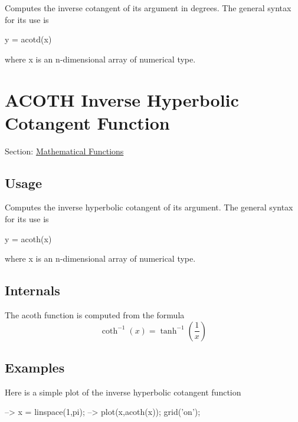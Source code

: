 Computes the inverse cotangent of its argument in degrees. The general syntax for its use is \begin{DoxyVerb}  y = acotd(x)
\end{DoxyVerb}
 where {\ttfamily x} is an {\ttfamily n}-\/dimensional array of numerical type. \hypertarget{mathfunctions_acoth}{}\section{A\-C\-O\-T\-H Inverse Hyperbolic Cotangent Function}\label{mathfunctions_acoth}
Section\-: \hyperlink{sec_mathfunctions}{Mathematical Functions} \hypertarget{vtkwidgets_vtkxyplotwidget_Usage}{}\subsection{Usage}\label{vtkwidgets_vtkxyplotwidget_Usage}
Computes the inverse hyperbolic cotangent of its argument. The general syntax for its use is \begin{DoxyVerb}  y = acoth(x)
\end{DoxyVerb}
 where {\ttfamily x} is an {\ttfamily n}-\/dimensional array of numerical type. \hypertarget{transforms_svd_Function}{}\subsection{Internals}\label{transforms_svd_Function}
The {\ttfamily acoth} function is computed from the formula \[ \coth^{-1}(x) = \tanh^{-1}\left(\frac{1}{x}\right) \] \hypertarget{variables_matrix_Examples}{}\subsection{Examples}\label{variables_matrix_Examples}
Here is a simple plot of the inverse hyperbolic cotangent function


\begin{DoxyVerbInclude}
--> x = linspace(1,pi);
--> plot(x,acoth(x)); grid('on');
\end{DoxyVerbInclude}


